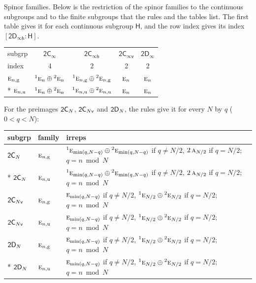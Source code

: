 \documentclass[10pt,a4paper]{article}
\makeatletter
\renewcommand\paragraph{\@startsection{paragraph}{4}{\z@}{1.5ex plus .5ex minus .2ex}{-1em}%
  {\normalfont\small\sffamily\bfseries\color{parttitle}}}
\numberwithin{equation}{section}
\newcommand{\grp}[1]{\mathsf{#1}}
\newcommand{\irr}[1]{\text{\normalfont\scshape #1}}
\newcommand{\conjpair}[1]{{}^{#1}}
\newcommand{\ptag}[1]{\mathrm{#1}}
\newcommand{\grpindex}[2]{[#1 : #2]}
\makeatother
\begin{document}
\paragraph{Spinor families.} Below is the restriction of the spinor families to the continuous subgroups and to the finite subgroups that the rules and the tables list. The first table gives it for each continuous subgroup $\grp{H}$, and the row index gives its index $\grpindex{\grp{2D_{\infty h}}}{\grp{H}}$.
{\small\begin{longtable}{@{}lcccc@{}}\toprule
subgrp & \href{2Cinf.pdf}{$\grp{2C_{\infty }}$} & \href{2Cinfh.pdf}{$\grp{2C_{\infty h}}$} & \href{2Cinfv.pdf}{$\grp{2C_{\infty v}}$} & \href{2Dinf.pdf}{$\grp{2D_{\infty }}$}\\
index & 4 & 2 & 2 & 2\\\midrule\endhead
\bottomrule\endfoot\endlastfoot
$\irr{e}_{n,\ptag{g}}$ & $\conjpair{1}\irr{e}_{n}\oplus \conjpair{2}\irr{e}_{n}$ & $\conjpair{1}\irr{e}_{n,\ptag{g}}\oplus \conjpair{2}\irr{e}_{n,\ptag{g}}$ & $\irr{e}_{n}$ & $\irr{e}_{n}$\\*
$\irr{e}_{n,\ptag{u}}$ & $\conjpair{1}\irr{e}_{n}\oplus \conjpair{2}\irr{e}_{n}$ & $\conjpair{1}\irr{e}_{n,\ptag{u}}\oplus \conjpair{2}\irr{e}_{n,\ptag{u}}$ & $\irr{e}_{n}$ & $\irr{e}_{n}$\\
\bottomrule\end{longtable}}
\leavevmode\label{n:index.residue}For the preimages $\grp{2C_{\mathnormal{N}}}$, $\grp{2C_{\mathnormal{N}v}}$ and $\grp{2D_{\mathnormal{N}}}$, the rules give it for every $N$ by $q$ ($0 < q < N$):
{\small\begin{longtable}{@{}ll>{\RaggedRight\arraybackslash}p{}@{}}\toprule
subgrp & family & irreps\\\midrule\endhead
\bottomrule\endfoot\endlastfoot
$\grp{2C_{\mathnormal{N}}}$ & $\irr{e}_{n,\ptag{g}}$ & $\conjpair{1}\irr{e}_{\min(q,N-q)}\oplus \conjpair{2}\irr{e}_{\min(q,N-q)}$ if $q \ne N/2$, $2\,\irr{a}_{N/2}$ if $q = N/2$; $q = n \bmod N$\\*
$\grp{2C_{\mathnormal{N}}}$ & $\irr{e}_{n,\ptag{u}}$ & $\conjpair{1}\irr{e}_{\min(q,N-q)}\oplus \conjpair{2}\irr{e}_{\min(q,N-q)}$ if $q \ne N/2$, $2\,\irr{a}_{N/2}$ if $q = N/2$; $q = n \bmod N$\\
$\grp{2C_{\mathnormal{N}v}}$ & $\irr{e}_{n,\ptag{g}}$ & $\irr{e}_{\min(q,N-q)}$ if $q \ne N/2$, $\conjpair{1}\irr{e}_{N/2}\oplus \conjpair{2}\irr{e}_{N/2}$ if $q = N/2$; $q = n \bmod N$\\
$\grp{2C_{\mathnormal{N}v}}$ & $\irr{e}_{n,\ptag{u}}$ & $\irr{e}_{\min(q,N-q)}$ if $q \ne N/2$, $\conjpair{1}\irr{e}_{N/2}\oplus \conjpair{2}\irr{e}_{N/2}$ if $q = N/2$; $q = n \bmod N$\\
$\grp{2D_{\mathnormal{N}}}$ & $\irr{e}_{n,\ptag{g}}$ & $\irr{e}_{\min(q,N-q)}$ if $q \ne N/2$, $\conjpair{1}\irr{e}_{N/2}\oplus \conjpair{2}\irr{e}_{N/2}$ if $q = N/2$; $q = n \bmod N$\\*
$\grp{2D_{\mathnormal{N}}}$ & $\irr{e}_{n,\ptag{u}}$ & $\irr{e}_{\min(q,N-q)}$ if $q \ne N/2$, $\conjpair{1}\irr{e}_{N/2}\oplus \conjpair{2}\irr{e}_{N/2}$ if $q = N/2$; $q = n \bmod N$\\
\bottomrule\end{longtable}}
\end{document}

